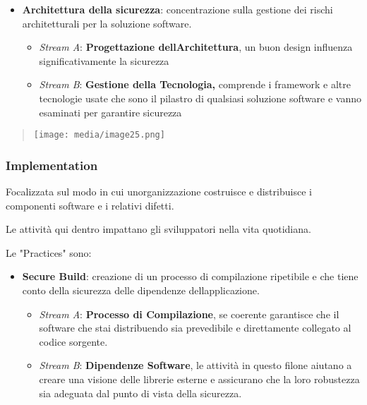 \begin{itemize}
\item
  \textbf{Architettura della sicurezza}: concentrazione sulla gestione
  dei rischi architetturali per la soluzione software.

  \begin{itemize}
  \item
    \emph{Stream A}: \textbf{Progettazione
    dell\textquotesingle Architettura}, un buon design influenza
    significativamente la sicurezza
  \item
    \emph{Stream B}: \textbf{Gestione della Tecnologia,} comprende i
    framework e altre tecnologie usate che sono il pilastro di qualsiasi
    soluzione software e vanno esaminati per garantire sicurezza
  \end{itemize}
\end{itemize}

\begin{quote}
\texttt{[image: media/image25.png]}
\end{quote}

\subsubsection{Implementation}\label{implementation}

Focalizzata sul modo in cui un\textquotesingle organizzazione costruisce
e distribuisce i componenti software e i relativi difetti.

Le attività qui dentro impattano gli sviluppatori nella vita quotidiana.

Le "Practices" sono:

\begin{itemize}
\item
  \textbf{Secure Build}: creazione di un processo di compilazione
  ripetibile e che tiene conto della sicurezza delle dipendenze
  dell\textquotesingle applicazione.

  \begin{itemize}
  \item
    \emph{Stream A}: \textbf{Processo di Compilazione}, se coerente
    garantisce che il software che stai distribuendo sia prevedibile e
    direttamente collegato al codice sorgente.
  \item
    \emph{Stream B}: \textbf{Dipendenze Software}, le attività in questo
    filone aiutano a creare una visione delle librerie esterne e
    assicurano che la loro robustezza sia adeguata dal punto di vista
    della sicurezza.
  \end{itemize}
\end{itemize}

